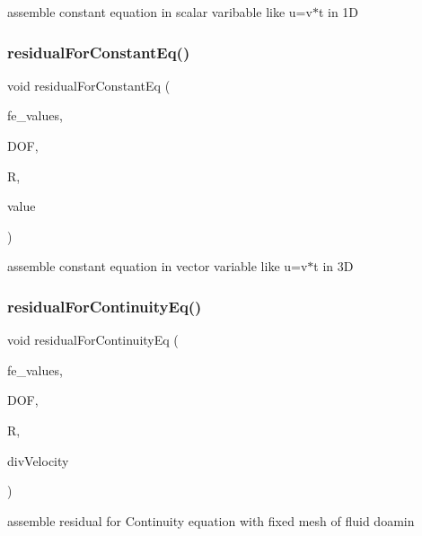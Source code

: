 assemble constant equation in scalar varibable like u=v$\ast$t in 1D \mbox{\label{class_residual_a5d0f09e08ac7a6603bab9f192fd3c109}} 
\subsubsection{\texorpdfstring{residual\+For\+Constant\+Eq()}{residualForConstantEq()}\hspace{0.1cm}{\footnotesize\ttfamily [2/2]}}
{\footnotesize\ttfamily void residual\+For\+Constant\+Eq (\begin{DoxyParamCaption}\item[{const F\+E\+Values$<$ dim $>$ \&}]{fe\+\_\+values,  }\item[{unsigned int}]{D\+OF,  }\item[{dealii\+::\+Table$<$ 1, T $>$ \&}]{R,  }\item[{dealii\+::\+Table$<$ 2, T $>$ \&}]{value }\end{DoxyParamCaption})}

assemble constant equation in vector variable like u=v$\ast$t in 3D \mbox{\label{class_residual_a882f4595a6547599cfe8f65897f45896}} 
\subsubsection{\texorpdfstring{residual\+For\+Continuity\+Eq()}{residualForContinuityEq()}\hspace{0.1cm}{\footnotesize\ttfamily [1/2]}}
{\footnotesize\ttfamily void residual\+For\+Continuity\+Eq (\begin{DoxyParamCaption}\item[{const F\+E\+Values$<$ dim $>$ \&}]{fe\+\_\+values,  }\item[{unsigned int}]{D\+OF,  }\item[{Table$<$ 1, T $>$ \&}]{R,  }\item[{Table$<$ 1, T $>$ \&}]{div\+Velocity }\end{DoxyParamCaption})}

assemble residual for Continuity equation with fixed mesh of fluid doamin \mbox{\label{class_residual_afddbdda003424f242266894fdd1f7b1a}} 
